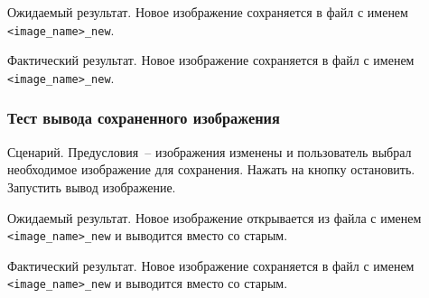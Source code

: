 Ожидаемый результат. Новое изображение сохраняется в файл с именем \lstinline{<image_name>_new}.

Фактический результат. Новое изображение сохраняется в файл с именем \lstinline{<image_name>_new}.

\subsubsection{Тест вывода сохраненного изображения}

Сценарий. Предусловия~-- изображения изменены и пользователь выбрал необходимое изображение для сохранения. Нажать на кнопку остановить. Запустить вывод изображение.

Ожидаемый результат. Новое изображение открывается из файла с именем \lstinline{<image_name>_new} и выводится вместо со старым.

Фактический результат. Новое изображение сохраняется в файл с именем \lstinline{<image_name>_new} и выводится вместо со старым.